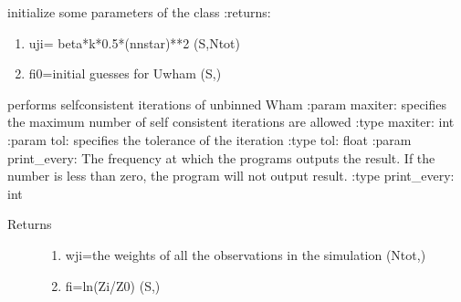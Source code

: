 \documentclass[letterpaper,10pt,english]{sphinxmanual}
\begin{document}
\begin{fulllineitems}
\begin{quote}
\begin{description}
\end{description}\end{quote}

\begin{fulllineitems}
\label{\detokenize{wham:wham.Uwham.Uwham.initialize}}
initialize some parameters of the class
:returns:
\begin{enumerate}
%
\item {} 
uji= beta*k*0.5*(n\sphinxhyphen{}nstar)**2 (S,Ntot)

\item {} 
fi0=initial guesses for Uwham (S,)

\end{enumerate}

\end{fulllineitems}


\begin{fulllineitems}
\label{\detokenize{wham:wham.Uwham.Uwham.self_consistent}}
performs self\sphinxhyphen{}consistent iterations of unbinned Wham
:param maxiter: specifies the maximum number of self consistent iterations are allowed
:type maxiter: int
:param tol: specifies the tolerance of the iteration
:type tol: float
:param print\_every: The frequency at which the programs outputs the result. If the number is less than zero, the program will not output result.
:type print\_every: int
\begin{description}
\item[{Returns}] \leavevmode\begin{enumerate}
%
\item {} 
wji=the weights of all the observations in the simulation (Ntot,)

\item {} 
fi=\sphinxhyphen{}ln(Zi/Z0) (S,)

\end{enumerate}

\end{description}


\end{fulllineitems}
\end{fulllineitems}
\end{document}
